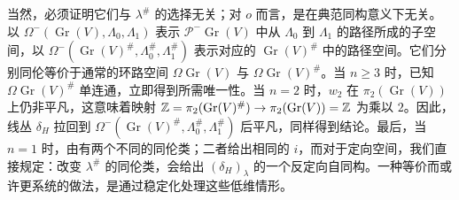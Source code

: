 当然，必须证明它们与 $\lambda^\#$ 的选择无关；对 $o$ 而言，是在典范同构意义下无关。以 $\Omega^-(\operatorname{Gr}(V),\allowbreak \Lambda_0,\allowbreak \Lambda_1)$ 表示 $\mathcal P^-\operatorname{Gr}(V)$ 中从 $\Lambda_0$ 到 $\Lambda_1$ 的路径所成的子空间，以 $\Omega^-(\operatorname{Gr}(V)^\#,\allowbreak \Lambda_0^\#,\allowbreak \Lambda_1^\#)$ 表示对应的 $\operatorname{Gr}(V)^\#$ 中的路径空间。它们分别同伦等价于通常的环路空间 $\Omega\operatorname{Gr}(V)$ 与 $\Omega\operatorname{Gr}(V)^\#$。当 $n\geq3$ 时，已知 $\Omega\operatorname{Gr}(V)^\#$ 单连通，立即得到所需唯一性。当 $n=2$ 时，$w_2$ 在 $\pi_2(\operatorname{Gr}(V))$ 上仍非平凡，这意味着映射 $\mathbb Z=\pi_2(\operatorname{Gr}(V)^\#)\to\pi_2(\operatorname{Gr}(V))=\mathbb Z$ 为乘以 $2$。因此，线丛 $\delta_H$ 拉回到 $\Omega^-(\operatorname{Gr}(V)^\#,\allowbreak \Lambda_0^\#,\allowbreak \Lambda_1^\#)$ 后平凡，同样得到结论。最后，当 $n=1$ 时，由有两个不同的同伦类；二者给出相同的 $i$，而对于定向空间，我们直接规定：改变 $\lambda^\#$ 的同伦类，会给出 $(\delta_H)_\lambda$ 的一个反定向自同构。一种等价而或许更系统的做法，是通过稳定化处理这些低维情形。


